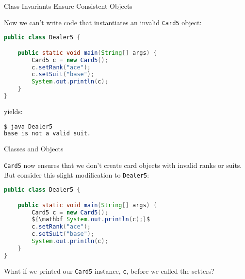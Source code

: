 \documentclass{beamer}
\begin{document}
\begin{frame}[fragile]{Class Invariants Ensure Consistent Objects}


Now we can't write code that instantiates an invalid {\tt Card5} object:
\begin{lstlisting}[language=Java]
public class Dealer5 {

    public static void main(String[] args) {
        Card5 c = new Card5();
        c.setRank("ace");
        c.setSuit("base");
        System.out.println(c);
    }
}
\end{lstlisting}
yields:
\begin{lstlisting}[language=bash]
$ java Dealer5
base is not a valid suit.
\end{lstlisting}

\end{frame}

\begin{frame}[fragile]{Classes and Objects}


{\tt Card5} now ensures that we don't create card objects with invalid ranks or suits.
But consider this slight modification to {\tt Dealer5}:
\begin{lstlisting}[language=Java,mathescape=true]
public class Dealer5 {

    public static void main(String[] args) {
        Card5 c = new Card5();
        ${\mathbf System.out.println(c);}$
        c.setRank("ace");
        c.setSuit("base");
        System.out.println(c);
    }
}
\end{lstlisting}

What if we printed our {\tt Card5} instance, {\tt c}, before we called the setters?

\end{frame}
\end{document}
